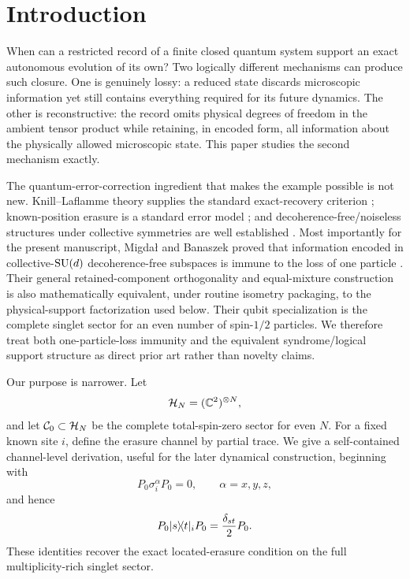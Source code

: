 \section{Introduction}
\label{sec:introduction}

When can a restricted record of a finite closed quantum system support an exact autonomous evolution of its own?  Two logically different mechanisms can produce such closure.  One is genuinely lossy: a reduced state discards microscopic information yet still contains everything required for its future dynamics.  The other is reconstructive: the record omits physical degrees of freedom in the ambient tensor product while retaining, in encoded form, all information about the physically allowed microscopic state.  This paper studies the second mechanism exactly.

The quantum-error-correction ingredient that makes the example possible is not new.  Knill--Laflamme theory supplies the standard exact-recovery criterion \cite{KnillLaflamme1997}; known-position erasure is a standard error model \cite{GrasslBethPellizzari1997}; and decoherence-free/noiseless structures under collective symmetries are well established \cite{ZanardiRasetti1997,LidarBaconWhaley1999,BaconKempeLidarWhaley2000}.  Most importantly for the present manuscript, Migda\l{} and Banaszek proved that information encoded in collective-$\mathrm{SU}(d)$ decoherence-free subspaces is immune to the loss of one particle \cite{MigdalBanaszek2011}.  Their general retained-component orthogonality and equal-mixture construction is also mathematically equivalent, under routine isometry packaging, to the physical-support factorization used below.  Their qubit specialization is the complete singlet sector for an even number of spin-$1/2$ particles.  We therefore treat both one-particle-loss immunity and the equivalent syndrome/logical support structure as direct prior art rather than novelty claims.

Our purpose is narrower.  Let
\begin{equation}
  \mathcal H_N=(\mathbb C^2)^{\otimes N},
\end{equation}
and let $\mathcal C_0\subset\mathcal H_N$ be the complete total-spin-zero sector for even $N$.  For a fixed known site $i$, define the erasure channel by partial trace.  We give a self-contained channel-level derivation, useful for the later dynamical construction, beginning with
\begin{equation}
  P_0\sigma_i^\alpha P_0=0,
  \qquad \alpha=x,y,z,
\end{equation}
and hence
\begin{equation}
  P_0\lvert s\rangle\!\langle t\rvert_iP_0
  =\frac{\delta_{st}}2P_0.
\end{equation}
These identities recover the exact located-erasure condition on the full multiplicity-rich singlet sector.

